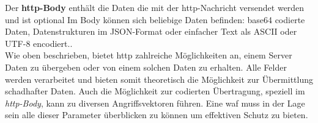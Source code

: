 Der \textbf{\ac{http}-Body} enthält die Daten die mit der \ac{http}-Nachricht versendet werden und ist optional
Im Body können sich beliebige Daten befinden: base64 codierte Daten, Datenstrukturen im JSON-Format oder einfacher Text als ASCII oder UTF-8 encodiert.\cite{HTTPMessagesHTTP2024}.\\

Wie oben beschrieben, bietet \ac{http} zahlreiche Möglichkeiten an, einem Server Daten zu übergeben oder von einem solchen Daten zu erhalten.
Alle Felder werden verarbeitet und bieten somit theoretisch die Möglichkeit zur Übermittlung schadhafter Daten.
Auch die Möglichkeit zur codierten Übertragung, speziell im \textit{\ac{http}-Body}, kann zu diversen Angriffsvektoren führen.
Eine \ac{waf} muss in der Lage sein alle dieser Parameter überblicken zu können um effektiven Schutz zu bieten.

\pagebreak    